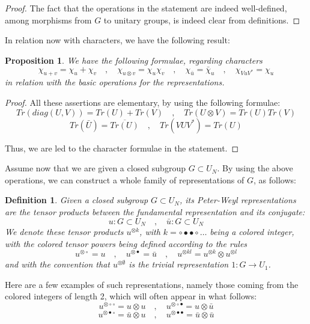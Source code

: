 \documentclass[12pt]{amsbook}
\newtheorem{definition}[theorem]{Definition}
\newtheorem{proposition}[theorem]{Proposition}
\begin{document}
\begin{proof}
The fact that the operations in the statement are indeed well-defined, among morphisms from $G$ to unitary groups, is indeed clear from definitions.
\end{proof}

In relation now with characters, we have the following result:

\begin{proposition}
We have the following formulae, regarding characters
$$\chi_{u+v}=\chi_u+\chi_v\quad,\quad 
\chi_{u\otimes v}=\chi_u\chi_v\quad,\quad 
\chi_{\bar{u}}=\bar{\chi}_u\quad,\quad
\chi_{VuV^*}=\chi_u$$
in relation with the basic operations for the representations.
\end{proposition}

\begin{proof}
All these assertions are elementary, by using the following formulae:
$$Tr(diag(U,V))=Tr(U)+Tr(V)\quad,\quad 
Tr(U\otimes V)=Tr(U)Tr(V)$$
$$Tr(\bar{U})=\overline{Tr(U)}\quad,\quad 
Tr(VUV^*)=Tr(U)$$

Thus, we are led to the character formulae in the statement.
\end{proof}

Assume now that we are given a closed subgroup $G\subset U_N$. By using the above operations, we can construct a whole family of representations of $G$, as follows:

\begin{definition}
Given a closed subgroup $G\subset U_N$, its Peter-Weyl representations are the tensor products between the fundamental representation and its conjugate:
$$u:G\subset U_N\quad,\quad 
\bar{u}:G\subset U_N$$ 
We denote these tensor products $u^{\otimes k}$, with $k=\circ\bullet\bullet\circ\ldots$ being a colored integer, with the colored tensor powers being defined according to the rules 
$$u^{\otimes\circ}=u\quad,\quad
u^{\otimes\bullet}=\bar{u}\quad,\quad
u^{\otimes kl}=u^{\otimes k}\otimes u^{\otimes l}$$
and with the convention that $u^{\otimes\emptyset}$ is the trivial representation $1:G\to U_1$.
\end{definition}

Here are a few examples of such representations, namely those coming from the colored integers of length 2, which will often appear in what follows:
$$u^{\otimes\circ\circ}=u\otimes u\quad,\quad 
u^{\otimes\circ\bullet}=u\otimes\bar{u}$$
$$u^{\otimes\bullet\circ}=\bar{u}\otimes u\quad,\quad
u^{\otimes\bullet\bullet}=\bar{u}\otimes\bar{u}$$
\end{document}
